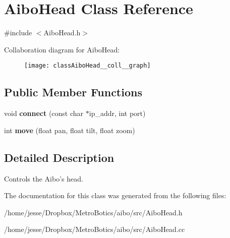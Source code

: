\hypertarget{classAiboHead}{
\section{AiboHead Class Reference}
\label{classAiboHead}
}


{\ttfamily \#include $<$AiboHead.h$>$}



Collaboration diagram for AiboHead:\nopagebreak
\begin{figure}[H]
\begin{center}
\leavevmode
\texttt{[image: classAiboHead\_\_coll\_\_graph]}
\end{center}
\end{figure}
\subsection*{Public Member Functions}
\begin{DoxyCompactItemize}
\item 
\hypertarget{classAiboHead_aca4c5c913ba3aa3774cbb52fb88db577}{
void {\bfseries connect} (const char $\ast$ip\_\-addr, int port)}
\label{classAiboHead_aca4c5c913ba3aa3774cbb52fb88db577}

\item 
\hypertarget{classAiboHead_adf0f91fafeaa5e32b5e387ac136e0f37}{
int {\bfseries move} (float pan, float tilt, float zoom)}
\label{classAiboHead_adf0f91fafeaa5e32b5e387ac136e0f37}

\end{DoxyCompactItemize}


\subsection{Detailed Description}
Controls the Aibo's head. 

The documentation for this class was generated from the following files:\begin{DoxyCompactItemize}
\item 
/home/jesse/Dropbox/MetroBotics/aibo/src/AiboHead.h\item 
/home/jesse/Dropbox/MetroBotics/aibo/src/AiboHead.cc\end{DoxyCompactItemize}
